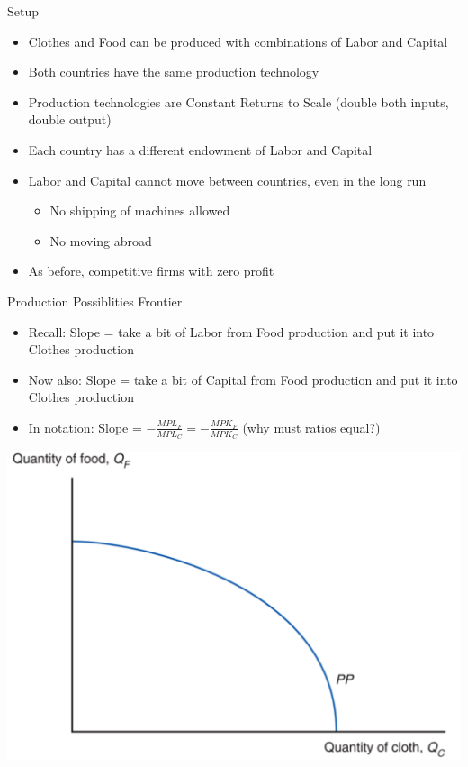 \documentclass[ignorenonframetext,]{beamer}
\begin{document}
\begin{frame}{Setup}

        \begin{itemize}
            \item Clothes and Food can be produced with combinations of Labor and Capital
            \item Both countries have the same production technology 
            \item Production technologies are Constant Returns to Scale (double both inputs, double output)
            \item Each country has a different endowment of Labor and Capital 
            \item Labor and Capital cannot move between countries, even in the long run
            \begin{itemize}
                \item No shipping of machines allowed
                \item No moving abroad
            \end{itemize}
            \item As before, competitive firms with zero profit
        \end{itemize}

\end{frame}

\begin{frame}{Production Possiblities Frontier}

    \begin{itemize}
        \item Recall:   Slope = take a bit of Labor from Food production and put it into Clothes production
        \item Now also: Slope = take a bit of Capital from Food production and put it into Clothes production
        \item In notation: Slope = $-\frac{MPL_F}{MPL_C} = -\frac{MPK_F}{MPK_C}$ (why must ratios equal?)
    \end{itemize}
    \includegraphics[scale=0.15]{ppf.png}

\end{frame}
\end{document}
